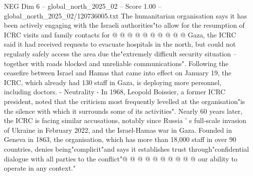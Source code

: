 \begin{textsample}{NEG Dim 6 – global\_north\_2025\_02 – Score 1.00 – global\_north\_2025\_02/120736005.txt}
The humanitarian organisation says it has been actively engaging with the Israeli authorities"to allow for the resumption of ICRC visits and family contacts for @ @ @ @ @ @ @ @ @ @ Gaza, the ICRC said it had received requests to evacuate hospitals in the north, but could not regularly safely access the area due the"extremely difficult security situation -- together with roads blocked and unreliable communications".
Following the ceasefire between Israel and Hamas that came into effect on January 19, the ICRC, which already had 130 staff in Gaza, is deploying more personnel, including doctors. - Neutrality - In 1968, Leopold Boissier, a former ICRC president, noted that the criticism most frequently levelled at the organisation"is the silence with which it surrounds some of its activities".
Nearly 60 years later, the ICRC is facing similar accusations, notably since Russia ' s full-scale invasion of Ukraine in February 2022, and the Israel-Hamas war in Gaza.
Founded in Geneva in 1863, the organisation, which has more than 18,000 staff in over 90 countries, denies being"complicit"and says it establishes trust through"confidential dialogue with all parties to the conflict"@ @ @ @ @ @ @ @ @ @ our ability to operate in any context."

\end{textsample}
